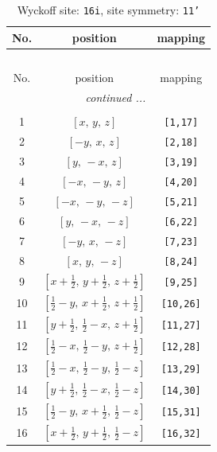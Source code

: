 \documentclass[fleqn,8pt]{jsarticle}
\begin{document}
\begin{longtable}{ccc}
\caption{Wyckoff site: {\tt 16i}, site symmetry: {\tt 11'}}
 \\
 \hline \hline
No. & position & mapping \\ \hline \endfirsthead

\multicolumn{2}{l}{\tablename\ \thetable{}} \\
 \hline \hline
No. & position & mapping \\ \hline \endhead

 \hline \hline
\multicolumn{2}{r}{\footnotesize\it continued ...} \\ \endfoot

 \hline \hline
\multicolumn{2}{r}{} \\ \endlastfoot

1 & $\left[ x,\, y,\, z \right]$ & {\tt [1,17]} \\ \hline
2 & $\left[ - y,\, x,\, z \right]$ & {\tt [2,18]} \\ \hline
3 & $\left[ y,\, - x,\, z \right]$ & {\tt [3,19]} \\ \hline
4 & $\left[ - x,\, - y,\, z \right]$ & {\tt [4,20]} \\ \hline
5 & $\left[ - x,\, - y,\, - z \right]$ & {\tt [5,21]} \\ \hline
6 & $\left[ y,\, - x,\, - z \right]$ & {\tt [6,22]} \\ \hline
7 & $\left[ - y,\, x,\, - z \right]$ & {\tt [7,23]} \\ \hline
8 & $\left[ x,\, y,\, - z \right]$ & {\tt [8,24]} \\ \hline
9 & $\left[ x + \frac{1}{2},\, y + \frac{1}{2},\, z + \frac{1}{2} \right]$ & {\tt [9,25]} \\ \hline
10 & $\left[ \frac{1}{2} - y,\, x + \frac{1}{2},\, z + \frac{1}{2} \right]$ & {\tt [10,26]} \\ \hline
11 & $\left[ y + \frac{1}{2},\, \frac{1}{2} - x,\, z + \frac{1}{2} \right]$ & {\tt [11,27]} \\ \hline
12 & $\left[ \frac{1}{2} - x,\, \frac{1}{2} - y,\, z + \frac{1}{2} \right]$ & {\tt [12,28]} \\ \hline
13 & $\left[ \frac{1}{2} - x,\, \frac{1}{2} - y,\, \frac{1}{2} - z \right]$ & {\tt [13,29]} \\ \hline
14 & $\left[ y + \frac{1}{2},\, \frac{1}{2} - x,\, \frac{1}{2} - z \right]$ & {\tt [14,30]} \\ \hline
15 & $\left[ \frac{1}{2} - y,\, x + \frac{1}{2},\, \frac{1}{2} - z \right]$ & {\tt [15,31]} \\ \hline
16 & $\left[ x + \frac{1}{2},\, y + \frac{1}{2},\, \frac{1}{2} - z \right]$ & {\tt [16,32]} \\
\end{longtable}
\end{document}
